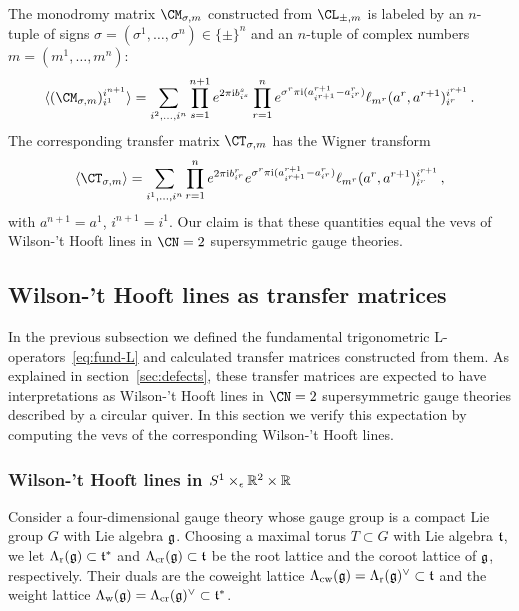 The monodromy matrix $\CM_{\sigma,m}$ constructed from $\CL_{\pm,m}$ is
labeled by an $n$-tuple of signs
$\sigma = (\sigma^1, \dotsc, \sigma^n) \in \{\pm\}^n$ and an $n$-tuple of
complex numbers $m = (m^1, \dotsc, m^n)$:
\begin{equation}
  \label{eq:M-trig}
  \vev{(\CM_{\sigma,m})_{i^1}^{i^{n+1}}}
  =
  \sum_{i^2, \dotsc, i^n}
  \prod_{s=1}^{n+1}
  e^{2\pi\iu b^s_{i^s}}
  \prod_{r=1}^n
  e^{\sigma^r \pi\iu(a^{r+1}_{i^{r+1}} - a^r_{i^r})}
  \ell_{m^r}(a^r, a^{r+1})_{i^r}^{i^{r+1}}
  \,.
\end{equation}
The corresponding transfer matrix $\CT_{\sigma,m}$ has the Wigner transform
\begin{equation}
  \label{eq:T-trig}
  \vev{\CT_{\sigma,m}}
  =
  \sum_{i^1, \dotsc, i^n}
  \prod_{r=1}^n e^{2\pi\iu b^r_{i^r}}
  e^{\sigma^r \pi\iu(a^{r+1}_{i^{r+1}} - a^r_{i^r})}
  \ell_{m^r}(a^r, a^{r+1})_{i^r}^{i^{r+1}}
  \,,
\end{equation}
with $a^{n+1} = a^1$, $i^{n+1} = i^1$.  Our claim is that these
quantities equal the vevs of Wilson-'t Hooft lines in $\CN = 2$
supersymmetric gauge theories.





\subsection{Wilson-'t Hooft lines as transfer matrices}
\label{sec:gauge}

In the previous subsection we defined the fundamental trigonometric
L-operators~\eqref{eq:fund-L} and calculated transfer matrices
constructed from them.  As explained in section~\ref{sec:defects}, these
transfer matrices are expected to have interpretations as Wilson-'t Hooft
lines in $\CN = 2$ supersymmetric gauge theories described by a
circular quiver.  In this section we verify this expectation by
computing the vevs of the corresponding Wilson-'t Hooft lines.


\subsubsection{Wilson-'t Hooft lines in $S^1 \times_\epsilon \mathbb{R}^2 \times \mathbb{R}$}

Consider a four-dimensional gauge theory whose gauge group is a
compact Lie group $G$ with Lie algebra $\mathfrak{g}$.  Choosing a maximal
torus $T \subset G$ with Lie algebra $\mathfrak{t}$, we let
$\Lambda_{\mathrm{r}}(\mathfrak{g}) \subset \mathfrak{t}^*$ and $\Lambda_{\mathrm{cr}}(\mathfrak{g}) \subset \mathfrak{t}$ be the
root lattice and the coroot lattice of $\mathfrak{g}$, respectively.  Their
duals are the coweight lattice
$\Lambda_{\mathrm{cw}}(\mathfrak{g}) = \Lambda_{\mathrm{r}}(\mathfrak{g})^\vee \subset \mathfrak{t}$ and the weight
lattice $\Lambda_{\mathrm{w}}(\mathfrak{g}) = \Lambda_{\mathrm{cr}}(\mathfrak{g})^\vee \subset \mathfrak{t}^*$.

